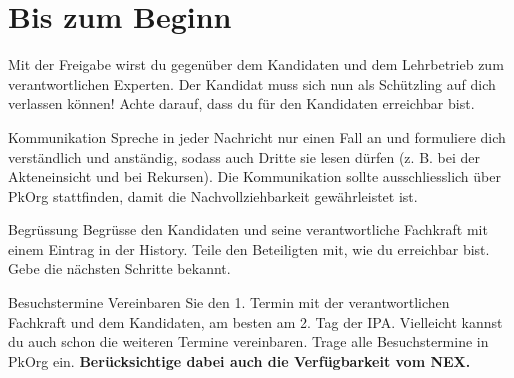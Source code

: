 \chapter{Bis zum Beginn}
Mit der Freigabe wirst du gegenüber dem Kandidaten und dem Lehrbetrieb zum verantwortlichen Experten. Der Kandidat muss sich nun als Schützling auf dich verlassen können! Achte darauf, dass du für den Kandidaten erreichbar bist.

\begin{taskitemwithoutcomment}{Kommunikation}
  Spreche in jeder Nachricht nur einen Fall an und formuliere dich verständlich und anständig, sodass auch Dritte sie lesen dürfen (z. B. bei der Akteneinsicht und bei Rekursen).
  Die Kommunikation sollte ausschliesslich über PkOrg stattfinden, damit die Nachvollziehbarkeit gewährleistet ist.
\end{taskitemwithoutcomment}
\begin{taskitemwithoutcomment}{Begrüssung}
  Begrüsse den Kandidaten und seine verantwortliche Fachkraft mit einem Eintrag in der History. Teile den Beteiligten mit, wie du erreichbar bist. Gebe die nächsten Schritte bekannt.
\end{taskitemwithoutcomment}
\begin{taskitem}{Besuchstermine}
  Vereinbaren Sie den 1. Termin mit der verantwortlichen Fachkraft und dem Kandidaten, am besten am 2. Tag der IPA. Vielleicht kannst du auch schon die weiteren Termine vereinbaren. Trage alle Besuchstermine in PkOrg ein. \textbf{Berücksichtige dabei auch die Verfügbarkeit vom NEX.}
\end{taskitem}